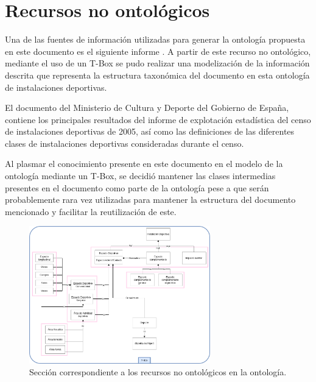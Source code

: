 \documentclass[a4paper,12pt]{article}
\begin{document}
	\section{Recursos no ontológicos}
	
	Una de las fuentes de información utilizadas para generar la ontología propuesta en este documento es el siguiente informe \cite{pdf-culturaydeporte}. A partir de este recurso no ontológico, mediante el uso de un T-Box se pudo realizar una modelización de la información descrita que representa la estructura taxonómica del documento en esta ontología de instalaciones deportivas. 
	
	El documento \cite{pdf-culturaydeporte} del Ministerio de Cultura y Deporte del Gobierno de España, contiene los  principales resultados del informe de explotación estadística del censo de instalaciones deportivas de 2005, así como las definiciones de las diferentes clases de instalaciones deportivas consideradas durante el censo.
	
	Al plasmar el conocimiento presente en este documento en el modelo de la ontología mediante un T-Box, se decidió mantener las clases intermedias presentes en el documento como parte de la ontología pese a que serán probablemente rara vez utilizadas para mantener la estructura del documento mencionado y facilitar la reutilización de este. 
	
	\begin{figure}[H]
		\centering
		\includegraphics[width=0.7\textwidth]{include/tbox.png}
		\caption{Sección correspondiente a los recursos no ontológicos en la ontología.}
	\end{figure}
	
\end{document}
